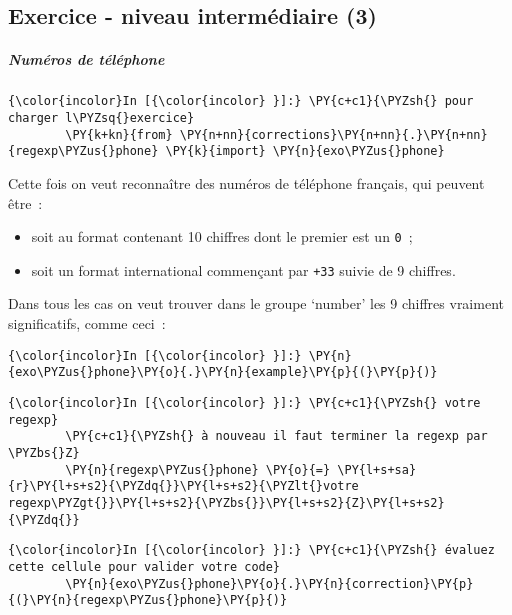     \hypertarget{exercice---niveau-intermuxe9diaire-3}{%
\subsection{Exercice - niveau intermédiaire
(3)}\label{exercice---niveau-intermuxe9diaire-3}}

    \hypertarget{numuxe9ros-de-tuxe9luxe9phone}{%
\subparagraph{Numéros de
téléphone}\label{numuxe9ros-de-tuxe9luxe9phone}}

    \begin{Verbatim}[commandchars=\\\{\}]
{\color{incolor}In [{\color{incolor} }]:} \PY{c+c1}{\PYZsh{} pour charger l\PYZsq{}exercice}
        \PY{k+kn}{from} \PY{n+nn}{corrections}\PY{n+nn}{.}\PY{n+nn}{regexp\PYZus{}phone} \PY{k}{import} \PY{n}{exo\PYZus{}phone}
\end{Verbatim}


    Cette fois on veut reconnaître des numéros de téléphone français, qui
peuvent être~:

\begin{itemize}
\tightlist
\item
  soit au format contenant 10 chiffres dont le premier est un
  \texttt{0}~;
\item
  soit un format international commençant par \texttt{+33} suivie de 9
  chiffres.
\end{itemize}

Dans tous les cas on veut trouver dans le groupe `number' les 9 chiffres
vraiment significatifs, comme ceci~:

    \begin{Verbatim}[commandchars=\\\{\}]
{\color{incolor}In [{\color{incolor} }]:} \PY{n}{exo\PYZus{}phone}\PY{o}{.}\PY{n}{example}\PY{p}{(}\PY{p}{)}
\end{Verbatim}


    \begin{Verbatim}[commandchars=\\\{\}]
{\color{incolor}In [{\color{incolor} }]:} \PY{c+c1}{\PYZsh{} votre regexp}
        \PY{c+c1}{\PYZsh{} à nouveau il faut terminer la regexp par \PYZbs{}Z}
        \PY{n}{regexp\PYZus{}phone} \PY{o}{=} \PY{l+s+sa}{r}\PY{l+s+s2}{\PYZdq{}}\PY{l+s+s2}{\PYZlt{}votre regexp\PYZgt{}}\PY{l+s+s2}{\PYZbs{}}\PY{l+s+s2}{Z}\PY{l+s+s2}{\PYZdq{}}
\end{Verbatim}


    \begin{Verbatim}[commandchars=\\\{\}]
{\color{incolor}In [{\color{incolor} }]:} \PY{c+c1}{\PYZsh{} évaluez cette cellule pour valider votre code}
        \PY{n}{exo\PYZus{}phone}\PY{o}{.}\PY{n}{correction}\PY{p}{(}\PY{n}{regexp\PYZus{}phone}\PY{p}{)}
\end{Verbatim}


